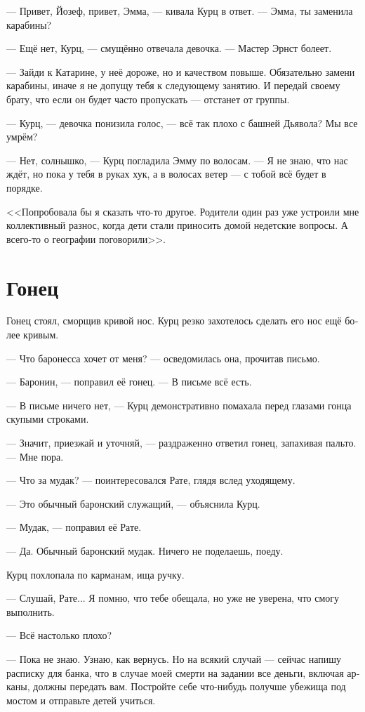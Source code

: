 \documentclass[a4paper,12pt,fleqn]{book}\usepackage{polyglossia}\setdefaultlanguage[babelshorthands=true]{russian}\setotherlanguage{english}\defaultfontfeatures{Ligatures=TeX,Mapping=tex-text}\usepackage{xcolor}\newcommand{\ml}[3]{#2}
\begin{document}
--- Привет, Йозеф, привет, Эмма, --- кивала Курц в ответ.
--- Эмма, ты заменила карабины?

--- Ещё нет, Курц, --- смущённо отвечала девочка.
--- Мастер Эрнст болеет.

--- Зайди к Катарине, у неё дороже, но и качеством повыше.
Обязательно замени карабины, иначе я не допущу тебя к следующему занятию.
И передай своему брату, что если он будет часто пропускать --- отстанет от группы.

--- Курц, --- девочка понизила голос, --- всё так плохо с башней Дьявола?
Мы все умрём?

--- Нет, солнышко, --- Курц погладила Эмму по волосам.
--- Я не знаю, что нас ждёт, но пока у тебя в руках хук, а в волосах ветер --- с тобой всё будет в порядке.

<<Попробовала бы я сказать что-то другое.
Родители один раз уже устроили мне коллективный разнос, когда дети стали приносить домой недетские вопросы.
А всего-то о географии поговорили>>.

\section{Гонец}

Гонец стоял, сморщив кривой нос.
Курц резко захотелось сделать его нос ещё более кривым.

--- Что баронесса хочет от меня? --- осведомилась она, прочитав письмо.

--- Баронин, --- поправил её гонец.
--- В письме всё есть.

--- В письме ничего нет, --- Курц демонстративно помахала перед глазами гонца скупыми строками.

--- Значит, приезжай и уточняй, --- раздраженно ответил гонец, запахивая пальто.
--- Мне пора.

--- Что за мудак? --- поинтересовался Рате, глядя вслед уходящему.

--- Это обычный баронский служащий, --- объяснила Курц.

--- Мудак, --- поправил её Рате.

--- Да.
Обычный баронский мудак.
Ничего не поделаешь, поеду.

Курц похлопала по карманам, ища ручку.

--- Слушай, Рате...
Я помню, что тебе обещала, но уже не уверена, что смогу выполнить.

--- Всё настолько плохо?

--- Пока не знаю.
Узнаю, как вернусь.
Но на всякий случай --- сейчас напишу расписку для банка, что в случае моей смерти на задании все деньги, включая арканы, должны передать вам.
Постройте себе что-нибудь получше убежища под мостом и отправьте детей учиться.
\end{document}
